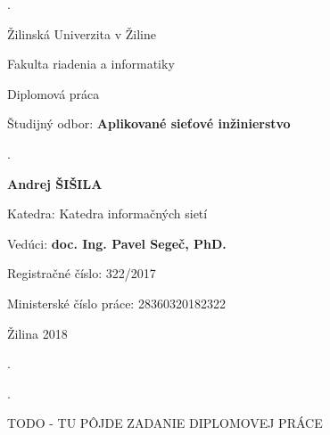 \begin{titlepage}

\phantom.

\bigskip

\begin{center}
{\sc\LARGE Žilinská Univerzita v Žiline}

\medskip

{\sc\Large Fakulta riadenia a informatiky}

\vfill\vfill\vfill\vfill

\bigskip
\bigskip

{\sc\LARGE Diplomová práca}

\medskip

{\large Študijný odbor: {\bf Aplikované sieťové inžinierstvo}}
\end{center}


\vfill\vfill\vfill\vfill


\phantom.\hfill
\begin{center}

{\large\bf \nazovpraceSK}

\bigskip

{\large\bf Andrej ŠIŠILA}

\bigskip
\bigskip

Katedra: Katedra informačných sietí

\medskip

Vedúci: {\bf doc. Ing. Pavel Segeč, PhD.}

\bigskip
\bigskip

Registračné číslo: 322/2017

\medskip

Ministerské číslo práce: 28360320182322

\medskip

Žilina 2018

\end{center}
\hspace{1.7cm}\phantom.

\vspace{2.9cm}

\phantom.
\end{titlepage}



\begin{huge}
    TODO - TU PÔJDE ZADANIE DIPLOMOVEJ PRÁCE
\end{huge}

